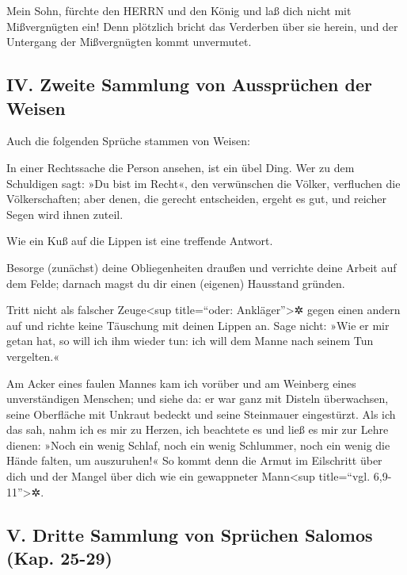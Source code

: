 Mein Sohn, fürchte den HERRN und den König und laß dich
nicht mit Mißvergnügten ein! Denn plötzlich bricht das
Verderben über sie herein, und der Untergang der Mißvergnügten kommt
unvermutet.

\hypertarget{iv.-zweite-sammlung-von-ausspruxfcchen-der-weisen}{%
\subsection{IV. Zweite Sammlung von Aussprüchen der
Weisen}\label{iv.-zweite-sammlung-von-ausspruxfcchen-der-weisen}}

Auch die folgenden Sprüche stammen von Weisen:

In einer Rechtssache die Person ansehen, ist ein übel Ding.
Wer zu dem Schuldigen sagt: »Du bist im Recht«, den
verwünschen die Völker, verfluchen die Völkerschaften;
aber denen, die gerecht entscheiden, ergeht es gut, und
reicher Segen wird ihnen zuteil.

Wie ein Kuß auf die Lippen ist eine treffende Antwort.

Besorge (zunächst) deine Obliegenheiten draußen und
verrichte deine Arbeit auf dem Felde; darnach magst du dir einen
(eigenen) Hausstand gründen.

Tritt nicht als falscher Zeuge\textless sup title=``oder:
Ankläger''\textgreater✲ gegen einen andern auf und richte keine
Täuschung mit deinen Lippen an. Sage nicht: »Wie er mir
getan hat, so will ich ihm wieder tun: ich will dem Manne nach seinem
Tun vergelten.«

Am Acker eines faulen Mannes kam ich vorüber und am
Weinberg eines unverständigen Menschen; und siehe da: er
war ganz mit Disteln überwachsen, seine Oberfläche mit Unkraut bedeckt
und seine Steinmauer eingestürzt. Als ich das sah, nahm
ich es mir zu Herzen, ich beachtete es und ließ es mir zur Lehre dienen:
»Noch ein wenig Schlaf, noch ein wenig Schlummer, noch
ein wenig die Hände falten, um auszuruhen!« So kommt denn
die Armut im Eilschritt über dich und der Mangel über dich wie ein
gewappneter Mann\textless sup title=``vgl. 6,9-11''\textgreater✲.

\hypertarget{v.-dritte-sammlung-von-spruxfcchen-salomos-kap.-25-29}{%
\subsection{V. Dritte Sammlung von Sprüchen Salomos (Kap.
25-29)}\label{v.-dritte-sammlung-von-spruxfcchen-salomos-kap.-25-29}}

